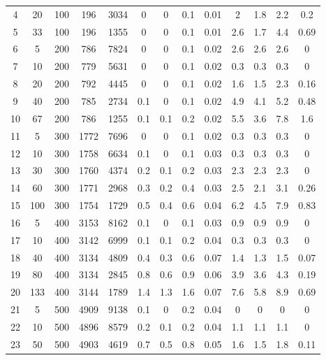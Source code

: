 \documentclass[11pt]{article}
\newcommand{\np}{\newpage}
\begin{document}
\begin{landscape}
\begin{longtable}[c]{ccccc|cccc|cccc}
		4 & 20 & 100 & 196 & 3034 & 0 & 0 & 0.1 & 0.01 & 2 & 1.8 & 2.2 & 0.2 \\
		\rowcolor[HTML]{EFEFEF} 
		5 & 33 & 100 & 196 & 1355 & 0 & 0 & 0.1 & 0.01 & 2.6 & 1.7 & 4.4 & 0.69 \\
		6 & 5 & 200 & 786 & 7824 & 0 & 0 & 0.1 & 0.02 & 2.6 & 2.6 & 2.6 & 0 \\
		7 & 10 & 200 & 779 & 5631 & 0 & 0 & 0.1 & 0.02 & 0.3 & 0.3 & 0.3 & 0 \\
		8 & 20 & 200 & 792 & 4445 & 0 & 0 & 0.1 & 0.02 & 1.6 & 1.5 & 2.3 & 0.16 \\
		9 & 40 & 200 & 785 & 2734 & 0.1 & 0 & 0.1 & 0.02 & 4.9 & 4.1 & 5.2 & 0.48 \\
		10 & 67 & 200 & 786 & 1255 & 0.1 & 0.1 & 0.2 & 0.02 & 5.5 & 3.6 & 7.8 & 1.6 \\
		\rowcolor[HTML]{EFEFEF} 
		11 & 5 & 300 & 1772 & 7696 & 0 & 0 & 0.1 & 0.02 & 0.3 & 0.3 & 0.3 & 0 \\
		\rowcolor[HTML]{EFEFEF} 
		12 & 10 & 300 & 1758 & 6634 & 0.1 & 0 & 0.1 & 0.03 & 0.3 & 0.3 & 0.3 & 0 \\
		\rowcolor[HTML]{EFEFEF} 
		13 & 30 & 300 & 1760 & 4374 & 0.2 & 0.1 & 0.2 & 0.03 & 2.3 & 2.3 & 2.3 & 0 \\
		\rowcolor[HTML]{EFEFEF} 
		14 & 60 & 300 & 1771 & 2968 & 0.3 & 0.2 & 0.4 & 0.03 & 2.5 & 2.1 & 3.1 & 0.26 \\
		\rowcolor[HTML]{EFEFEF} 
		15 & 100 & 300 & 1754 & 1729 & 0.5 & 0.4 & 0.6 & 0.04 & 6.2 & 4.5 & 7.9 & 0.83 \\
		16 & 5 & 400 & 3153 & 8162 & 0.1 & 0 & 0.1 & 0.03 & 0.9 & 0.9 & 0.9 & 0 \\
		17 & 10 & 400 & 3142 & 6999 & 0.1 & 0.1 & 0.2 & 0.04 & 0.3 & 0.3 & 0.3 & 0 \\
		18 & 40 & 400 & 3134 & 4809 & 0.4 & 0.3 & 0.6 & 0.07 & 1.4 & 1.3 & 1.5 & 0.07 \\
		19 & 80 & 400 & 3134 & 2845 & 0.8 & 0.6 & 0.9 & 0.06 & 3.9 & 3.6 & 4.3 & 0.19 \\
		20 & 133 & 400 & 3144 & 1789 & 1.4 & 1.3 & 1.6 & 0.07 & 7.6 & 5.8 & 8.9 & 0.69 \\ \np
		\rowcolor[HTML]{EFEFEF} 
		21 & 5 & 500 & 4909 & 9138 & 0.1 & 0 & 0.2 & 0.04 & 0 & 0 & 0 & 0 \\
		\rowcolor[HTML]{EFEFEF} 
		22 & 10 & 500 & 4896 & 8579 & 0.2 & 0.1 & 0.2 & 0.04 & 1.1 & 1.1 & 1.1 & 0 \\
		\rowcolor[HTML]{EFEFEF} 
		23 & 50 & 500 & 4903 & 4619 & 0.7 & 0.5 & 0.8 & 0.05 & 1.6 & 1.5 & 1.8 & 0.11 \\

\end{longtable}
\end{landscape}
\end{document}
